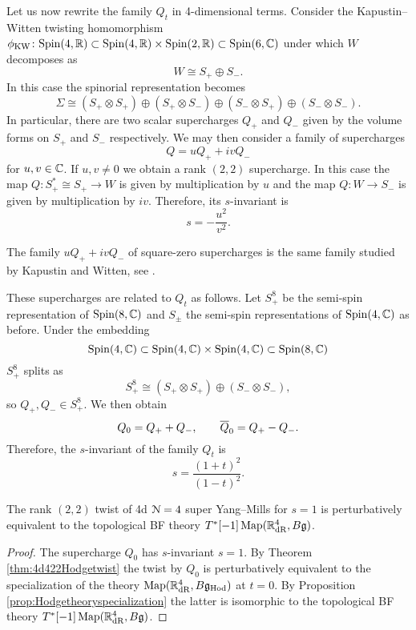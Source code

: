 \documentclass[10pt, oneside]{article}
\begin{document}
Let us now rewrite the family $Q_t$ in 4-dimensional terms. Consider the Kapustin--Witten twisting homomorphism $\phi_{\mathrm{KW}}\colon \Spin(4, \RR)\subset \Spin(4, \RR)\times \Spin(2, \RR)\subset \Spin(6, \CC)$ under which $W$ decomposes as
\[W\cong S_+\oplus S_-.\]
In this case the spinorial representation becomes
\[\Sigma\cong (S_+\otimes S_+)\oplus (S_+\otimes S_-)\oplus (S_-\otimes S_+)\oplus (S_-\otimes S_-).\]
In particular, there are two scalar supercharges $Q_+$ and $Q_-$ given by the volume forms on $S_+$ and $S_-$ respectively. We may then consider a family of supercharges
\[Q = u Q_+ + i v Q_-\]
for $u, v\in\CC$. If $u,v\neq 0$ we obtain a rank $(2, 2)$ supercharge. In this case the map $Q\colon S_+^*\cong S_+\rightarrow W$ is given by multiplication by $u$ and the map $Q\colon W\rightarrow S_-$ is given by multiplication by $iv$. Therefore, its $s$-invariant is
\[s = -\frac{u^2}{v^2}.\]

\begin{remark}
The family $uQ_+ + iv Q_-$ of square-zero supercharges is the same family studied by Kapustin and Witten, see \cite[Section 3.1]{KapustinWitten}.
\end{remark}

These supercharges are related to $Q_t$ as follows. Let $S_+^8$ be the semi-spin representation of $\Spin(8, \CC)$ and $S_\pm$ the semi-spin representations of $\Spin(4, \CC)$ as before. Under the embedding
\[\Spin(4, \CC)\subset \Spin(4, \CC)\times \Spin(4, \CC)\subset \Spin(8, \CC)\]
$S_+^8$ splits as
\[S_+^8\cong (S_+\otimes S_+)\oplus (S_-\otimes S_-),\]
so $Q_+, Q_-\in S_+^8$. We then obtain
\[Q_0 = Q_+ + Q_-,\qquad \Bar{Q}_0 = Q_+ - Q_-.\]
Therefore, the $s$-invariant of the family $Q_t$ is
\begin{equation}
s = \frac{(1+t)^2}{(1-t)^2}.
\label{eq:4d4sinvariant}
\end{equation}

\begin{corollary}
The rank $(2, 2)$ twist of 4d $\cN=4$ super Yang--Mills for $s=1$ is perturbatively equivalent to the topological BF theory $T^*[-1]\map(\RR^4_{\mathrm{dR}}, B\fg)$.
\end{corollary}
\begin{proof}
The supercharge $Q_0$ has $s$-invariant $s=1$. By Theorem \ref{thm:4d422Hodgetwist} the twist by $Q_0$ is perturbatively equivalent to the specialization of the theory $\map(\RR^4_{\mathrm{dR}}, B\fg_{\Hod})$ at $t=0$. By Proposition \ref{prop:Hodgetheoryspecialization} the latter is isomorphic to the topological BF theory $T^*[-1]\map(\RR^4_{\mathrm{dR}}, B\fg)$.
\end{proof}
\end{document}
